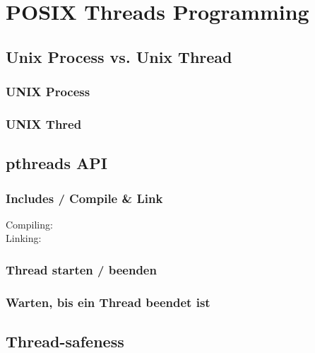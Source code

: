 \section{POSIX Threads Programming}



\subsection{Unix Process vs. Unix Thread}


\subsubsection{UNIX Process}


\subsubsection{UNIX Thred}


\subsection{pthreads API}

\subsubsection{Includes / Compile \& Link}



\begin{description}
    \item[Compiling:] 
    \item[Linking:] 
\end{description}


\subsubsection{Thread starten / beenden}


\subsubsection{Warten, bis ein Thread beendet ist}


\subsection{Thread-safeness}